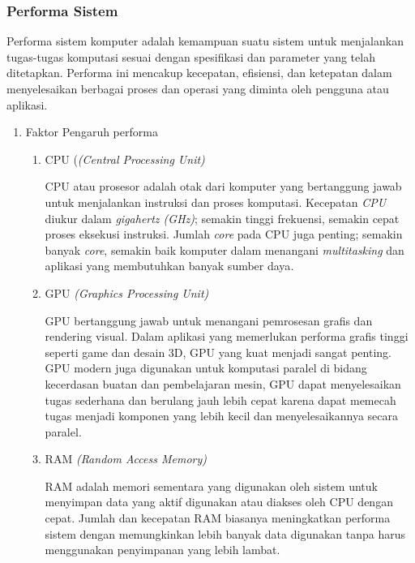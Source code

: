 \documentclass[12pt]{article}
\begin{document}
\subsubsection{Performa Sistem}
    Performa sistem komputer adalah kemampuan suatu sistem untuk menjalankan tugas-tugas komputasi sesuai dengan spesifikasi dan parameter yang telah ditetapkan. Performa ini mencakup kecepatan, efisiensi, dan ketepatan dalam menyelesaikan berbagai proses dan operasi yang diminta oleh pengguna atau aplikasi.
\begin{enumerate}
    \item {Faktor Pengaruh performa}
    \par \begin{enumerate}
        \item {CPU (\textit{(Central Processing Unit)}}
        \par CPU atau prosesor adalah otak dari komputer yang bertanggung jawab untuk menjalankan instruksi dan proses komputasi. Kecepatan \textit{CPU} diukur dalam \textit{gigahertz (GHz)}; semakin tinggi frekuensi, semakin cepat proses eksekusi instruksi. Jumlah \textit{core} pada CPU juga penting; semakin banyak \textit{core}, semakin baik komputer dalam menangani \textit{multitasking} dan aplikasi yang membutuhkan banyak sumber daya\cite{3.2.1 Vaia}.
        \item {GPU \textit{(Graphics Processing Unit)}}
        \par GPU bertanggung jawab untuk menangani pemrosesan grafis dan rendering visual. Dalam aplikasi yang memerlukan performa grafis tinggi seperti game dan desain 3D, GPU yang kuat menjadi sangat penting. GPU modern juga digunakan untuk komputasi paralel di bidang kecerdasan buatan dan pembelajaran mesin, GPU dapat menyelesaikan tugas sederhana dan berulang jauh lebih cepat karena dapat memecah tugas menjadi komponen yang lebih kecil dan menyelesaikannya secara paralel\cite{3.2.1 AWS. GPU vs CPU}.
        
        \item {RAM \textit{(Random Access Memory)}}
        \par RAM adalah memori sementara yang digunakan oleh sistem untuk menyimpan data yang aktif digunakan atau diakses oleh CPU dengan cepat. Jumlah dan kecepatan RAM biasanya meningkatkan performa sistem dengan memungkinkan lebih banyak data digunakan tanpa harus menggunakan penyimpanan yang lebih lambat\cite{3.2.1 Algor Cards}.

    \end{enumerate}
    

\end{enumerate}
\end{document}
